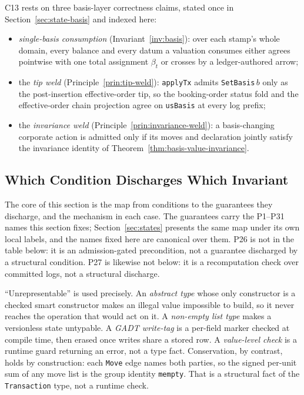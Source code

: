 C13 rests on three basis-layer correctness claims, stated once in Section~\ref{sec:state-basis} and indexed here:
\begin{itemize}[nosep]
\item \emph{single-basis consumption} (Invariant~\ref{inv:basis}): over each stamp's whole domain, every balance and every datum a valuation consumes either agrees pointwise with one total assignment $\beta_t$ or crosses by a ledger-authored arrow;
\item the \emph{tip weld} (Principle~\ref{prin:tip-weld}): \texttt{applyTx} admits \texttt{SetBasis}\,$b$ only as the post-insertion effective-order tip, so the booking-order status fold and the effective-order chain projection agree on \texttt{usBasis} at every log prefix;
\item the \emph{invariance weld} (Principle~\ref{prin:invariance-weld}): a basis-changing corporate action is admitted only if its moves and declaration jointly satisfy the invariance identity of Theorem~\ref{thm:basis-value-invariance}.
\end{itemize}

\subsection{Which Condition Discharges Which Invariant}
\label{sec:invariants-discharge}

The core of this section is the map from conditions to the guarantees they discharge, and the mechanism in each case. The guarantees carry the P1--P31 names this section fixes; Section~\ref{sec:states} presents the same map under its own local labels, and the names fixed here are canonical over them. P26 is not in the table below: it is an admission-gated precondition, not a guarantee discharged by a structural condition. P27 is likewise not below: it is a recomputation check over committed logs, not a structural discharge.

``Unrepresentable'' is used precisely. An \emph{abstract type} whose only constructor is a checked smart constructor makes an illegal value impossible to build, so it never reaches the operation that would act on it. A \emph{non-empty list type} makes a versionless state untypable. A \emph{GADT write-tag} is a per-field marker checked at compile time, then erased once writes share a stored row. A \emph{value-level check} is a runtime guard returning an error, not a type fact. Conservation, by contrast, holds by construction: each \texttt{Move} edge names both parties, so the signed per-unit sum of any move list is the group identity \texttt{mempty}. That is a structural fact of the \texttt{Transaction} type, not a runtime check.

